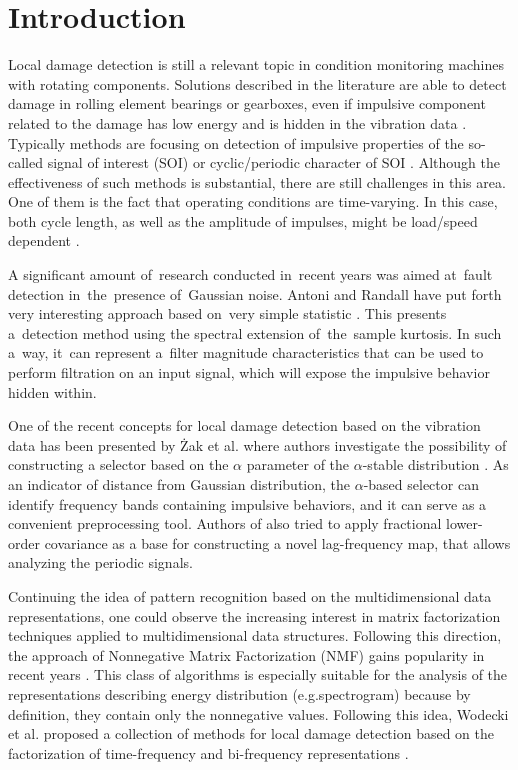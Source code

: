\documentclass[3p,12pt]{elsarticle}
\begin{document}
\linenumbers

\section{Introduction}

Local damage detection is still a relevant topic in condition monitoring machines with rotating components. Solutions described in the literature are able to detect damage in rolling element bearings or gearboxes, even if impulsive component related to the damage has low energy and is hidden in the vibration data \cite{samuel2005review,randall2011rolling}. Typically methods are focusing on detection of impulsive properties of the so-called signal of interest (SOI) \cite{antoni2006spectral,wodecki2018optimal,zak20161932,obuchowski2014selection} or cyclic/periodic character of SOI \cite{cioch2013finding}. Although the effectiveness of such methods is substantial, there are still challenges in this area. One of them is the fact that operating conditions are time-varying. In this case, both cycle length, as well as the amplitude of impulses, might be load/speed dependent \cite{gryllias2018application}.

A significant amount of~research conducted in~recent years was aimed at~fault detection in~the~presence of~Gaussian noise. Antoni and Randall have put forth very interesting approach based on~very simple statistic \cite{antoni_randall}. This presents a~detection method using the spectral extension of~the~sample kurtosis. In such a~way, it~can represent a~filter magnitude characteristics that can be used to perform filtration on an input signal, which will expose the impulsive behavior hidden within.

One of the recent concepts for local damage detection based on the vibration data has been presented by {\.Z}ak et al. where authors investigate the possibility of constructing a selector based on the $\alpha$ parameter of the $\alpha$-stable distribution \cite{zak20161932}. As an indicator of distance from Gaussian distribution, the $\alpha$-based selector can identify frequency bands containing impulsive behaviors, and it can serve as a convenient preprocessing tool. Authors of \cite{zak2019periodically} also tried to apply fractional lower-order covariance as a base for constructing a novel lag-frequency map, that allows analyzing the periodic signals.

Continuing the idea of pattern recognition based on the multidimensional data representations, one could observe the increasing interest in matrix factorization techniques applied to multidimensional data structures. Following this direction, the approach of Nonnegative Matrix Factorization (NMF) gains popularity in recent years \cite{cichocki2009nonnegative,lee1999learning,zdunek2008data}. This class of algorithms is especially suitable for the analysis of the representations describing energy distribution (e.g.spectrogram) because by definition, they contain only the nonnegative values. Following this idea, Wodecki et al. proposed a collection of methods for local damage detection based on the factorization of time-frequency and bi-frequency representations \cite{wodecki2017local,wodecki2019novel,wodecki2019impulsive}.
\end{document}
